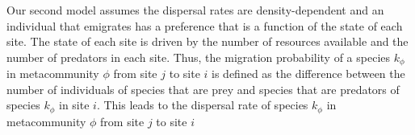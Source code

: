 Our second model assumes the dispersal rates are density-dependent and
an individual that emigrates has a preference that is a function of
the state of each site. The state of each site is driven by the number
of resources available and the number of predators in each site. Thus,
the migration probability of a species $k_{\mathcal{\phi}}$ in
metacommunity $\mathcal{\phi}$ from site $j$ to site $i$ is defined as
the difference between the number of individuals of species that are
prey and species that are predators of species $k_{\mathcal{\phi}}$ in
site $i$. This leads to the dispersal rate of species
$k_{\mathcal{\phi}}$ in metacommunity $\mathcal{\phi}$ from site $j$
to site $i$

%
%
%
%
%


